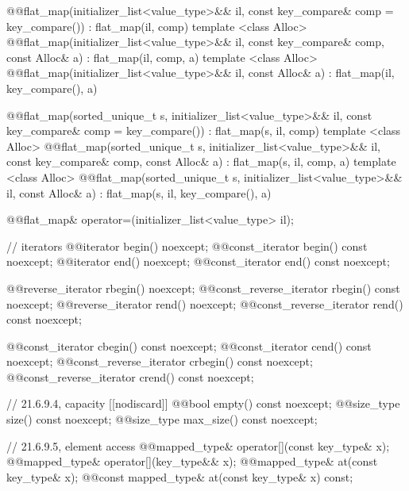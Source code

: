 \begin{codeblock}
{{    @@flat_map(initializer_list<value_type>&& il,
                       const key_compare& comp = key_compare())
        : flat_map(il, comp) { }
    template <class Alloc>
      @@flat_map(initializer_list<value_type>&& il,
                         const key_compare& comp, const Alloc& a)
        : flat_map(il, comp, a) { }
    template <class Alloc>
      @@flat_map(initializer_list<value_type>&& il, const Alloc& a)
        : flat_map(il, key_compare(), a) { }

    @@flat_map(sorted_unique_t s, initializer_list<value_type>&& il,
                       const key_compare& comp = key_compare())
        : flat_map(s, il, comp) { }
    template <class Alloc>
      @@flat_map(sorted_unique_t s, initializer_list<value_type>&& il,
                         const key_compare& comp, const Alloc& a)
        : flat_map(s, il, comp, a) { }
    template <class Alloc>
      @@flat_map(sorted_unique_t s, initializer_list<value_type>&& il,
                         const Alloc& a)
        : flat_map(s, il, key_compare(), a) { }

    @@flat_map& operator=(initializer_list<value_type> il);

    // iterators
    @@iterator                begin() noexcept;
    @@const_iterator          begin() const noexcept;
    @@iterator                end() noexcept;
    @@const_iterator          end() const noexcept;

    @@reverse_iterator        rbegin() noexcept;
    @@const_reverse_iterator  rbegin() const noexcept;
    @@reverse_iterator        rend() noexcept;
    @@const_reverse_iterator  rend() const noexcept;

    @@const_iterator          cbegin() const noexcept;
    @@const_iterator          cend() const noexcept;
    @@const_reverse_iterator  crbegin() const noexcept;
    @@const_reverse_iterator  crend() const noexcept;

    // 21.6.9.4, capacity
    [[nodiscard]] @@bool empty() const noexcept;
    @@size_type size() const noexcept;
    @@size_type max_size() const noexcept;

    // 21.6.9.5, element access
    @@mapped_type& operator[](const key_type& x);
    @@mapped_type& operator[](key_type&& x);
    @@mapped_type& at(const key_type& x);
    @@const mapped_type& at(const key_type& x) const;

}}
\end{codeblock}
